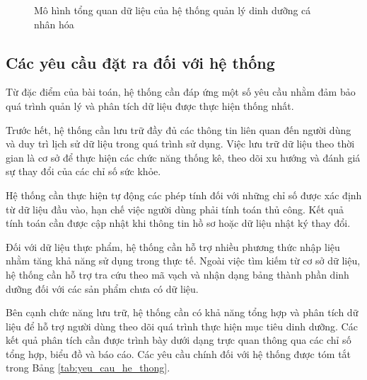 \documentclass[12pt, a4paper]{report}
\begin{document}
\begin{figure}[htbp]
{
    }
    \caption{Mô hình tổng quan dữ liệu của hệ thống quản lý dinh dưỡng cá nhân hóa}
    \label{fig:tong_quan_bai_toan}
\end{figure}

\subsection{Các yêu cầu đặt ra đối với hệ thống}Từ đặc điểm của bài toán, hệ thống cần đáp ứng một số yêu cầu nhằm đảm bảo quá trình quản lý và phân tích dữ liệu được thực hiện thống nhất.

Trước hết, hệ thống cần lưu trữ đầy đủ các thông tin liên quan đến người dùng và duy trì lịch sử dữ liệu trong quá trình sử dụng. Việc lưu trữ dữ liệu theo thời gian là cơ sở để thực hiện các chức năng thống kê, theo dõi xu hướng và đánh giá sự thay đổi của các chỉ số sức khỏe.

Hệ thống cần thực hiện tự động các phép tính đối với những chỉ số được xác định từ dữ liệu đầu vào, hạn chế việc người dùng phải tính toán thủ công. Kết quả tính toán cần được cập nhật khi thông tin hồ sơ hoặc dữ liệu nhật ký thay đổi.

Đối với dữ liệu thực phẩm, hệ thống cần hỗ trợ nhiều phương thức nhập liệu nhằm tăng khả năng sử dụng trong thực tế. Ngoài việc tìm kiếm từ cơ sở dữ liệu, hệ thống cần hỗ trợ tra cứu theo mã vạch và nhận dạng bảng thành phần dinh dưỡng đối với các sản phẩm chưa có dữ liệu.

Bên cạnh chức năng lưu trữ, hệ thống cần có khả năng tổng hợp và phân tích dữ liệu để hỗ trợ người dùng theo dõi quá trình thực hiện mục tiêu dinh dưỡng. Các kết quả phân tích cần được trình bày dưới dạng trực quan thông qua các chỉ số tổng hợp, biểu đồ và báo cáo. Các yêu cầu chính đối với hệ thống được tóm tắt trong Bảng \ref{tab:yeu_cau_he_thong}.
\end{document}

